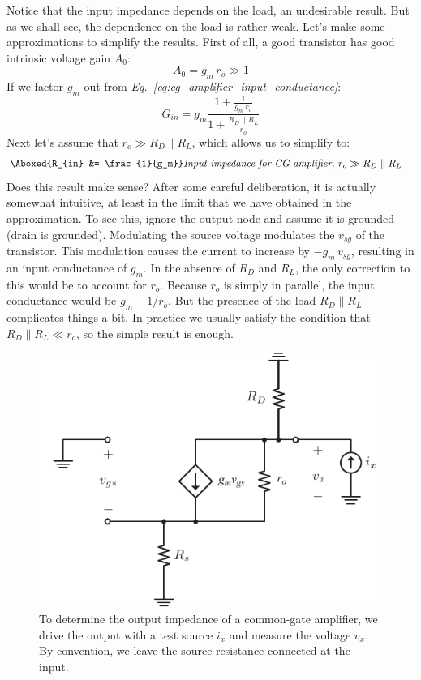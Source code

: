 Notice that the input impedance depends on the load, an undesirable result.  But as we shall see, the dependence on the load is rather weak.  Let's make some approximations to simplify the results.  First of all, a good transistor has good intrinsic voltage gain $A_0$: 
    \begin{equation}
        A_0 = g_m\,r_o \gg 1
    \end{equation}
If we factor $g_m$ out from \emph{Eq.~\ref{eq:cg_amplifier_input_conductance}}:
    \begin{equation}
        G_{in} = g_m \frac{1 + \frac{1}{g_m\,r_o}}{1 + \frac{R_D \parallel R_L}{r_o}}
    \end{equation}
Next let's assume that $r_o \gg R_D \parallel R_L$, which allows us to simplify to:
    \begin{align}
        \Aboxed{R_{in} &= \frac{1}{g_m}} &\textit{Input impedance for CG amplifier, $r_o \gg R_D \parallel R_L$}
        \label{eq:cg_amplifier_input_impedance_big_r_o}
    \end{align}
Does this result make sense?  After some careful deliberation, it is actually somewhat intuitive, at least in the limit that we have obtained in the approximation.  To see this, ignore the output node and assume it is grounded (drain is grounded). Modulating the source voltage modulates the $v_{sg}$ of the transistor.  This modulation causes the current to increase by $-g_m\,v_{sg}$, resulting in an input conductance of $g_m$.  In the absence of $R_D$ and $R_L$, the only correction to this would be to account for $r_o$.  Because $r_o$ is simply in parallel, the input conductance would be $g_m + 1/r_o$.  But the presence of the load $R_D \parallel R_L$ complicates things a bit.  In practice we usually satisfy the condition that $R_D \parallel R_L \ll r_o$, so the simple result is enough. 
\begin{figure}[t]
\centering
\includegraphics[scale=1.15]{cgamp_is_ac_ss_rout}
\caption{To determine the output impedance of a common-gate amplifier, we drive the output with a test source $i_x$ and measure the voltage $v_x$.  By convention, we leave the source resistance connected at the input.}
\label{fig:cgamp_is_ac_ss_rout}
\end{figure}
